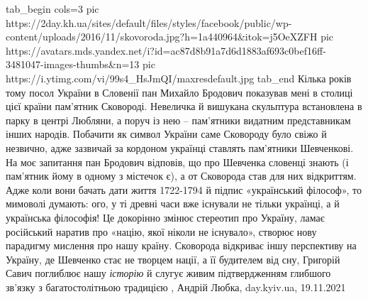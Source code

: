 \ifcmt
  tab_begin cols=3
     pic https://2day.kh.ua/sites/default/files/styles/facebook/public/wp-content/uploads/2016/11/skovoroda.jpg?h=1a440964&itok=j5OeXZFH
		 pic https://avatars.mds.yandex.net/i?id=ac87d8b91a7d6d1883af693c0bef16ff-3481047-images-thumbs&n=13
     pic https://i.ytimg.com/vi/99s4_HsJmQI/maxresdefault.jpg
  tab_end
\fi
Кілька років тому посол України в Словенії пан Михайло Бродович показував мені
в столиці цієї країни пам’ятник Сковороді. Невеличка й вишукана скульптура
встановлена в парку в центрі Любляни, а поруч із нею – пам’ятники видатним
представникам інших народів. Побачити як символ України саме Сковороду було
свіжо й незвично, адже зазвичай за кордоном українці ставлять пам’ятники
Шевченкові.  На моє запитання пан Бродович відповів, що про Шевченка словенці
знають (і пам’ятник йому в одному з містечок є), а от Сковорода став для них
відкриттям.  Адже коли вони бачать дати життя 1722-1794 й підпис «український
філософ», то мимоволі думають: ого, у ті древні часи вже існували не тільки
українці, а й українська філософія! Це докорінно змінює стереотип про Україну,
ламає російський наратив про «націю, якої ніколи не існувало», створює нову
парадигму мислення про нашу країну. Сковорода відкриває іншу перспективу на
Україну, де Шевченко стає не творцем нації, а її будителем від сну, Григорій
Савич поглиблює нашу \emph{історію} й слугує живим підтвердженням глибшого
зв’язку з багатостолітньою традицією
, 
Андрій Любка, day.kyiv.ua, 19.11.2021
